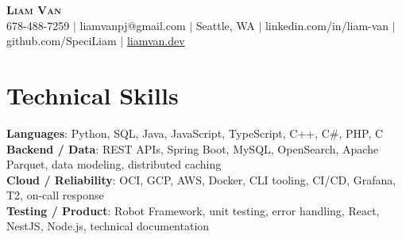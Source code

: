 \documentclass[letterpaper,11pt]{article}
\begin{document}

%
\begin{center}
    \textbf{\Huge \scshape Liam Van} \\ \vspace{1pt}
    \small 678-488-7259 $|$ \small {liamvanpj@gmail.com} $|$ Seattle, WA
 {{$|$ linkedin.com/in/liam-van} {$|$ github.com/SpeciLiam} {$|$ \href{https://liamvan.dev}{liamvan.dev}}}

\end{center}

\section{Technical Skills}
 \begin{itemize}[leftmargin=0.15in, label={}]
    \small{\item{
     \textbf{Languages}{: Python, SQL, Java, JavaScript, TypeScript, C++, C\#, PHP, C} \\
     \textbf{Backend / Data}{: REST APIs, Spring Boot, MySQL, OpenSearch, Apache Parquet, data modeling, distributed caching} \\
     \textbf{Cloud / Reliability}{: OCI, GCP, AWS, Docker, CLI tooling, CI/CD, Grafana, T2, on-call response} \\
     \textbf{Testing / Product}{: Robot Framework, unit testing, error handling, React, NestJS, Node.js, technical documentation} \\
    }}
 \end{itemize}
%

\end{document}
